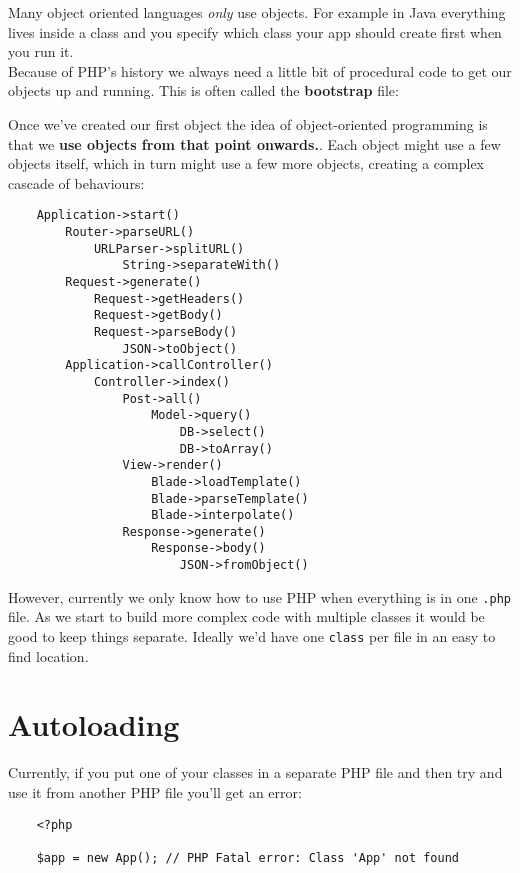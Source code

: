 Many object oriented languages \textit{only} use objects. For example in Java everything lives inside a class and you specify which class your app should create first when you run it.
\\

Because of PHP's history we always need a little bit of procedural code to get our objects up and running. This is often called the \textbf{bootstrap} file:


Once we've created our first object the idea of object-oriented programming is that we \textbf{use objects from that point onwards.}. Each object might use a few objects itself, which in turn might use a few more objects, creating a complex cascade of behaviours:

\begin{verbatim}
    Application->start()
        Router->parseURL()
            URLParser->splitURL()
                String->separateWith()
        Request->generate()
            Request->getHeaders()
            Request->getBody()
            Request->parseBody()
                JSON->toObject()
        Application->callController()
            Controller->index()
                Post->all()
                    Model->query()
                        DB->select()
                        DB->toArray()
                View->render()
                    Blade->loadTemplate()
                    Blade->parseTemplate()
                    Blade->interpolate()
                Response->generate()
                    Response->body()
                        JSON->fromObject()
\end{verbatim}

However, currently we only know how to use PHP when everything is in one \texttt{.php} file. As we start to build more complex code with multiple classes it would be good to keep things separate. Ideally we'd have one \texttt{class} per file in an easy to find location.


\section{Autoloading}

Currently, if you put one of your classes in a separate PHP file and then try and use it from another PHP file you'll get an error:

\begin{verbatim}
    <?php

    $app = new App(); // PHP Fatal error: Class 'App' not found
\end{verbatim}


